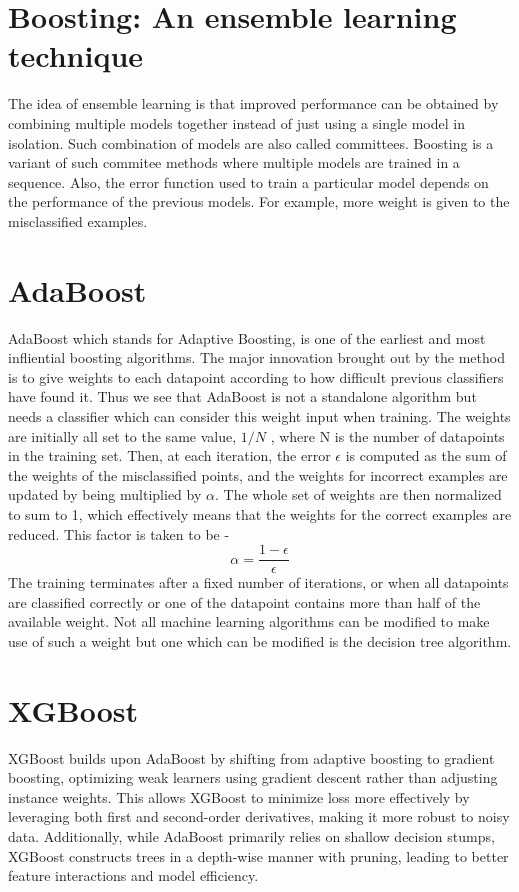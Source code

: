 \documentclass{../template/texnote}
\begin{document}
\section{Boosting: An ensemble learning technique}

The idea of ensemble learning is that improved performance can be obtained by combining multiple models together instead of just using a single model in isolation.
Such combination of models are also called committees.
Boosting is a variant of such commitee methods where multiple models are trained in a sequence.
Also, the error function used to train a particular model depends on the performance of the previous models.
For example, more weight is given to the misclassified examples.

\section{AdaBoost}
AdaBoost which stands for Adaptive Boosting, is one of the earliest and most infliential boosting algorithms.
The major innovation brought out by the method is to give weights to each datapoint according to how difficult previous classifiers have found it.
Thus we see that AdaBoost is not a standalone algorithm but needs a classifier which can consider this weight input when training.
The weights are initially all set to the same value, $1/N$ , where N is the number of datapoints in the training set.
Then, at each iteration, the error $\epsilon$ is computed as the sum of the weights of the misclassified points, and the weights for incorrect examples are updated by being multiplied by $\alpha$. The whole set of weights are then normalized to sum to 1, which effectively means that the weights for the correct examples are reduced.
This factor is taken to be - \[ \alpha = \frac{1-\epsilon}{\epsilon}\]
The training terminates after a fixed number of iterations, or when all datapoints are classified correctly or one of the datapoint contains more than half of the available weight.
Not all machine learning algorithms can be modified to make use of such a weight but one which can be modified is the decision tree algorithm.

\section{XGBoost}
XGBoost builds upon AdaBoost by shifting from adaptive boosting to gradient boosting, optimizing weak learners using gradient descent rather than adjusting instance weights. This allows XGBoost to minimize loss more effectively by leveraging both first and second-order derivatives, making it more robust to noisy data. Additionally, while AdaBoost primarily relies on shallow decision stumps, XGBoost constructs trees in a depth-wise manner with pruning, leading to better feature interactions and model efficiency.
\end{document}
